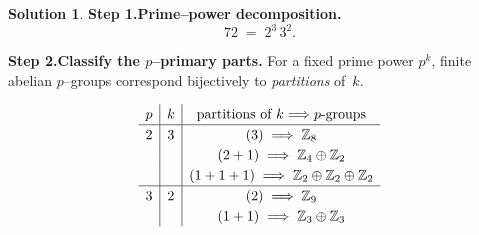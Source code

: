 \documentclass[12pt]{article}
\theoremstyle{definition} %
\newtheorem{solution}{Solution}
\theoremstyle{plain} %
\begin{document}
              \begin{solution}
                \textbf{Step 1.\;Prime–power decomposition.}  
                \[
                   72 \;=\; 2^{3}\,3^{2}.
                \]
                
                \textbf{Step 2.\;Classify the $p$–primary parts.}  
                For a fixed prime power $p^{k}$, finite abelian $p$–groups correspond
                bijectively to \emph{partitions} of~$k$.
                
                \[
                \renewcommand{\arraystretch}{1.2}
                \begin{array}{c|c|c}
                p & k & \text{partitions of }k \Longrightarrow \text{$p$-groups}\\\hline
                2 & 3 & (3)\;\Longrightarrow\;\Bbb Z_{8}\\
                  &   & (2+1)\;\Longrightarrow\;\Bbb Z_{4}\oplus\Bbb Z_{2}\\
                  &   & (1+1+1)\;\Longrightarrow\;\Bbb Z_{2}\oplus\Bbb Z_{2}\oplus\Bbb Z_{2}\\\hline
                3 & 2 & (2)\;\Longrightarrow\;\Bbb Z_{9}\\
                  &   & (1+1)\;\Longrightarrow\;\Bbb Z_{3}\oplus\Bbb Z_{3}
                \end{array}
                \]
                

\end{solution}
\end{document}
